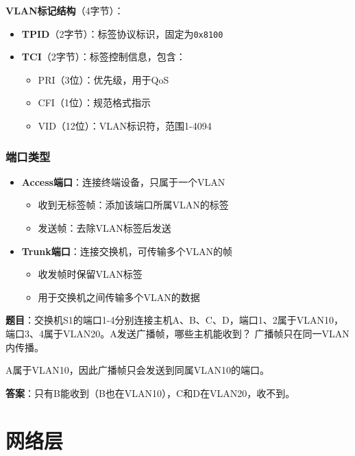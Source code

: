 \documentclass[12pt,a4paper,openany]{ctexbook}
\begin{document}
\textbf{VLAN标记结构}（4字节）：
\begin{itemize}[leftmargin=2em,itemsep=0pt]
    \item \textbf{TPID}（2字节）：标签协议标识，固定为\texttt{0x8100}
    \item \textbf{TCI}（2字节）：标签控制信息，包含：
    \begin{itemize}[itemsep=0pt]
        \item PRI（3位）：优先级，用于QoS
        \item CFI（1位）：规范格式指示
        \item VID（12位）：VLAN标识符，范围1-4094
    \end{itemize}
\end{itemize}

\subsection{端口类型}
\begin{itemize}[leftmargin=2em,itemsep=0pt]
    \item \textbf{Access端口}：连接终端设备，只属于一个VLAN
    \begin{itemize}[itemsep=0pt]
        \item 收到无标签帧：添加该端口所属VLAN的标签
        \item 发送帧：去除VLAN标签后发送
    \end{itemize}
    \item \textbf{Trunk端口}：连接交换机，可传输多个VLAN的帧
    \begin{itemize}[itemsep=0pt]
        \item 收发帧时保留VLAN标签
        \item 用于交换机之间传输多个VLAN的数据
    \end{itemize}
\end{itemize}

\begin{examplebox}[例题3.7 VLAN通信]
\textbf{题目}：交换机S1的端口1-4分别连接主机A、B、C、D，端口1、2属于VLAN10，端口3、4属于VLAN20。A发送广播帧，哪些主机能收到？
\tcblower
广播帧只在同一VLAN内传播。

A属于VLAN10，因此广播帧只会发送到同属VLAN10的端口。

\textbf{答案}：只有B能收到（B也在VLAN10），C和D在VLAN20，收不到。
\end{examplebox}


\chapter{网络层}
\end{document}
